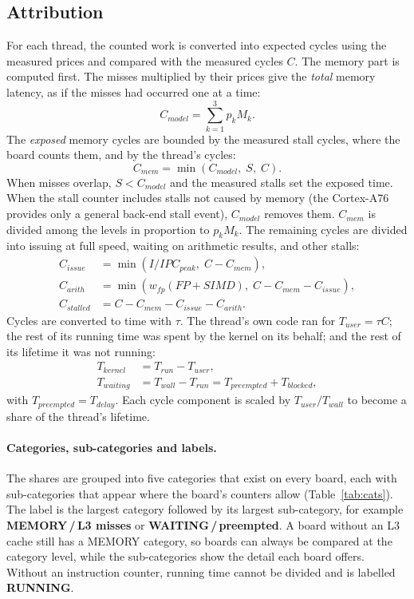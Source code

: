 \documentclass[10pt,a4paper,twocolumn]{article}
\begin{document}
\subsection{Attribution}\label{sec:attr}
For each thread, the counted work is converted into expected cycles using the measured prices and compared with the measured cycles $C$. The memory part is computed first. The misses multiplied by their prices give the \emph{total} memory latency, as if the misses had occurred one at a time:
\begin{equation}
C_{model} = \sum_{k=1}^{3} p_k M_k .
\end{equation}
The \emph{exposed} memory cycles are bounded by the measured stall cycles, where the board counts them, and by the thread's cycles:
\begin{equation}
C_{mem} = \min\left(C_{model},\; S,\; C\right).
\end{equation}
When misses overlap, $S<C_{model}$ and the measured stalls set the exposed time. When the stall counter includes stalls not caused by memory (the Cortex-A76 provides only a general back-end stall event), $C_{model}$ removes them. $C_{mem}$ is divided among the levels in proportion to $p_kM_k$. The remaining cycles are divided into issuing at full speed, waiting on arithmetic results, and other stalls:
\begin{align}
C_{issue} &= \min\!\left(I/IPC_{peak},\; C - C_{mem}\right), \\
C_{arith} &= \min\!\left(w_{fp}(FP+SIMD),\; C - C_{mem} - C_{issue}\right), \\
C_{stalled} &= C - C_{mem} - C_{issue} - C_{arith}.
\end{align}
Cycles are converted to time with $\tau$. The thread's own code ran for $T_{user}=\tau C$; the rest of its running time was spent by the kernel on its behalf; and the rest of its lifetime it was not running:
\begin{align}
T_{kernel} &= T_{run} - T_{user}, \\
T_{waiting} &= T_{wall} - T_{run} = T_{preempted} + T_{blocked},
\end{align}
with $T_{preempted}=T_{delay}$. Each cycle component is scaled by $T_{user}/T_{wall}$ to become a share of the thread's lifetime.

\paragraph{Categories, sub-categories and labels.} The shares are grouped into five categories that exist on every board, each with sub-categories that appear where the board's counters allow (Table~\ref{tab:cats}). The label is the largest category followed by its largest sub-category, for example \textbf{MEMORY\,/\,L3 misses} or \textbf{WAITING\,/\,preempted}. A board without an L3 cache still has a MEMORY category, so boards can always be compared at the category level, while the sub-categories show the detail each board offers. Without an instruction counter, running time cannot be divided and is labelled \textbf{RUNNING}.
\end{document}
